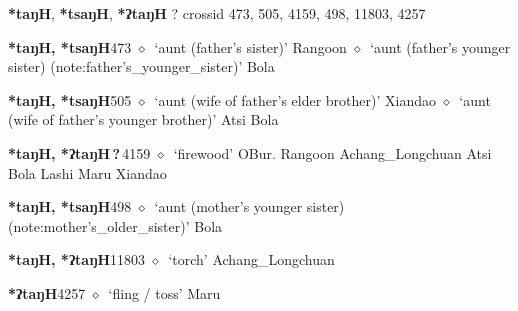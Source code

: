 \textbf{*taŋH}, \textbf{*tsaŋH}, \textbf{*ʔtaŋH}
?
  {\tiny crossid 473, 505, 4159, 498, 11803, 4257}
  \begin{list}{}{\leftmargin=1.5em \itemindent=-1.5em}
  \item {\footnotesize \textbf{*taŋH, *tsaŋH}}{\tiny 473}
         $\diamond$~`aunt (father's sister)'
         Rangoon 
\hspace{1ex}
         $\diamond$~`aunt (father's younger sister) (note:father's_younger_sister)'
         Bola 
  \item {\footnotesize \textbf{*taŋH, *tsaŋH}}{\tiny 505}
\hspace{1ex}
         $\diamond$~`aunt (wife of father's elder brother)'
         Xiandao 
\hspace{1ex}
         $\diamond$~`aunt (wife of father's younger brother)'
         Atsi 
\hspace{1ex}
         Bola 
  \item {\footnotesize \textbf{*taŋH, *ʔtaŋH\,?\,}}{\tiny 4159}
\hspace{1ex}
         $\diamond$~`firewood'
         OBur. 
\hspace{1ex}
         Rangoon 
\hspace{1ex}
         Achang\_Longchuan 
\hspace{1ex}
         Atsi 
\hspace{1ex}
         Bola 
\hspace{1ex}
         Lashi 
\hspace{1ex}
         Maru 
\hspace{1ex}
         Xiandao 
  \item {\footnotesize \textbf{*taŋH, *tsaŋH}}{\tiny 498}
\hspace{1ex}
         $\diamond$~`aunt (mother's younger sister) (note:mother's_older_sister)'
         Bola 
  \item {\footnotesize \textbf{*taŋH, *ʔtaŋH}}{\tiny 11803}
\hspace{1ex}
         $\diamond$~`torch'
         Achang\_Longchuan 
  \item {\footnotesize \textbf{*ʔtaŋH}}{\tiny 4257}
\hspace{1ex}
         $\diamond$~`fling / toss'
         Maru 
  \end{list}
